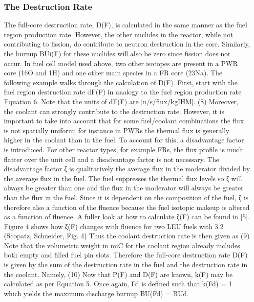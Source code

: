 \subsubsection{The Destruction Rate}
\label{1g_sec:d_rate}
The full-core destruction rate, D(F), is calculated in the same manner as the fuel region production rate.  However, the other nuclides in the reactor, while not contributing to fission, do contribute to neutron destruction in the core. Similarly, the burnup BUi(F) for these nuclides will also be zero since fission does not occur. In fuel cell model used above, two other isotopes are present in a PWR core (16O and 1H) and one other main species in a FR core (23Na).
The following example walks through the calculation of D(F).  First, start with the fuel region destruction rate dF(F) in analogy to the fuel region production rate Equation 6.  Note that the units of dF(F) are [n/s/flux/kgIHM].  
                                (8)
Moreover, the coolant can strongly contribute to the destruction rate.  However, it is important to take into account that for some fuel/coolant combinations the flux is not spatially uniform; for instance in PWRs the thermal flux is generally higher in the coolant than in the fuel. To account for this, a disadvantage factor is introduced.  For other reactor types, for example FRs, the flux profile is much flatter over the unit cell and a disadvantage factor is not necessary. The disadvantage factor ζ is qualitatively the average flux in the moderator divided by the average flux in the fuel. The fuel suppresses the thermal flux levels so ζ will always be greater than one and the flux in the moderator will always be greater than the flux in the fuel. Since it is dependent on the composition of the fuel, ζ is therefore also a function of the fluence because the fuel isotopic makeup is altered as a function of fluence. A fuller look at how to calculate ζ(F) can be found in [5].  Figure 4 shows how ζ(F) changes with fluence for two LEU fuels with 3.2%
(Scopatz, Schneider, Fig. 4)
Thus the coolant destruction rate is then given as
                        (9)
Note that the volumetric weight in miC for the coolant region already includes both empty and filled fuel pin slots.  Therefore the full-core destruction rate D(F) is given by the sum of the destruction rate in the fuel and the destruction rate in the coolant.  Namely, 
                                (10)
Now that P(F) and D(F) are known, k(F) may be calculated as per Equation 5.  Once again, Fd is defined such that k(Fd) = 1 which yields the maximum discharge burnup BU(Fd) = BUd.



